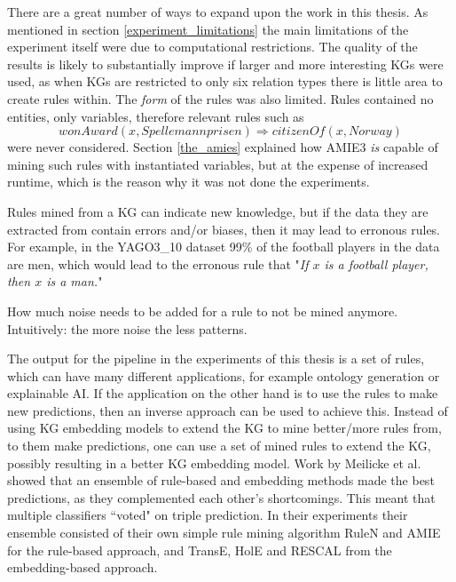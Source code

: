 There are a great number of ways to expand upon the work in this thesis. As mentioned in section \ref{experiment_limitations} the main limitations of the experiment itself were due to computational restrictions. The quality of the results is likely to substantially improve if larger and more interesting KGs were used, as when KGs are restricted to only six relation types there is little area to create rules within. The \textit{form} of the rules was also limited. Rules contained no entities, only variables, therefore relevant rules such as
\[wonAward(x, Spellemannprisen) \Rightarrow citizenOf(x, Norway)\]
were never considered. Section \ref{the_amies} explained how AMIE3 \textit{is} capable of mining such rules with instantiated variables, but at the expense of increased runtime, which is the reason why it was not done the experiments.

Rules mined from a KG can indicate new knowledge, but if the data they are extracted from contain errors and/or biases, then it may lead to erronous rules. For example, in the YAGO3\_10 dataset 99\% of the football players in the data are men, which would lead to the erronous rule that "\textit{If $x$ is a football player, then $x$ is a man.}"

How much noise needs to be added for a rule to not be mined anymore. Intuitively: the more noise the less patterns.

The output for the pipeline in the experiments of this thesis is a set of rules, which can have many different applications, for example ontology generation or explainable AI. If the application on the other hand is to use the rules to make new predictions, then an inverse approach can be used to achieve this. Instead of using KG embedding models to extend the KG to mine better/more rules from, to them make predictions, one can use a set of mined rules to extend the KG, possibly resulting in a better KG embedding model. Work by Meilicke et al. \cite{ensemble} showed that an ensemble of rule-based and embedding methods made the best predictions, as they complemented each other's shortcomings. This meant that multiple classifiers ``voted" on triple prediction. In their experiments their ensemble consisted of their own simple rule mining algorithm RuleN and AMIE for the rule-based approach, and TransE, HolE and RESCAL from the embedding-based approach.